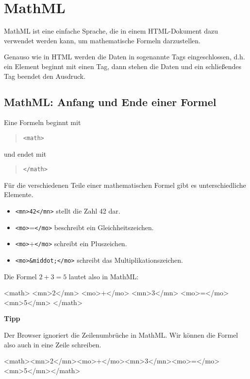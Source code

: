 \section{MathML}

MathML ist eine einfache Sprache, die in einem HTML-Dokument dazu verwendet werden kann, um mathematische Formeln darzustellen.

Genauso wie in HTML werden die Daten in sogenannte Tags eingeschlossen, d.h. ein Element beginnt mit einen Tag, dann stehen die Daten und ein schließendes Tag beendet den Ausdruck. 

\subsection*{MathML: Anfang und Ende einer Formel}

Eine Formeln beginnt mit

\begin{quote}
	\texttt{<math>}
\end{quote}

und endet mit

\begin{quote}
	\texttt{</math>}
\end{quote}

Für die verschiedenen Teile einer mathematischen Formel gibt es unterschiedliche Elemente.
\begin{itemize}
	\item \texttt{<mn>42</mn>} stellt die Zahl 42 dar.
	\item \texttt{<mo>}=\texttt{</mo>} beschreibt ein Gleichheitszeichen.
	\item \texttt{<mo>}+\texttt{</mo>} schreibt ein Pluszeichen.
	\item \texttt{<mo>\&middot;</mo>} schreibt das Multiplikationszeichen.
\end{itemize}

Die Formel $2 + 3 = 5$ lautet also in MathML:

\begin{codeHTML}
<math>
	<mn>2</mn>
	<mo>+</mo>
	<mn>3</mn>
	<mo>=</mo>
	<mn>5</mn>
</math>
\end{codeHTML}

\textbf{Tipp}

Der Browser ignoriert die Zeilenumbrüche in MathML. Wir können die Formel also auch in eine Zeile schreiben.

\begin{codeHTML}
<math><mn>2</mn><mo>+</mo><mn>3</mn><mo>=</mo><mn>5</mn></math>
\end{codeHTML}

